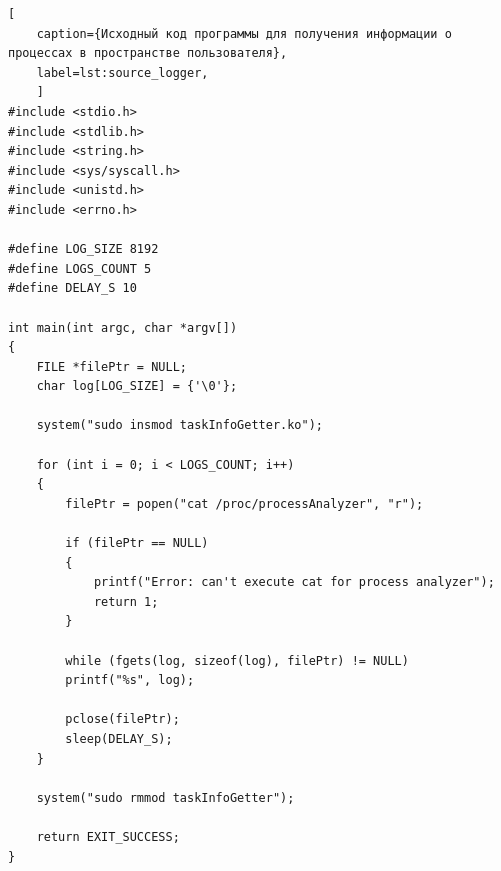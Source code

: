 \begin{lstlisting}[
	caption={Исходный код программы для получения информации о процессах в пространстве пользователя},
	label=lst:source_logger,
	]
#include <stdio.h>
#include <stdlib.h>
#include <string.h>
#include <sys/syscall.h>
#include <unistd.h>
#include <errno.h>

#define LOG_SIZE 8192
#define LOGS_COUNT 5
#define DELAY_S 10

int main(int argc, char *argv[])
{
	FILE *filePtr = NULL;
	char log[LOG_SIZE] = {'\0'};
	
	system("sudo insmod taskInfoGetter.ko");
	
	for (int i = 0; i < LOGS_COUNT; i++)
	{
		filePtr = popen("cat /proc/processAnalyzer", "r");
		
		if (filePtr == NULL)
		{
			printf("Error: can't execute cat for process analyzer");
			return 1;
		}
		
		while (fgets(log, sizeof(log), filePtr) != NULL)
		printf("%s", log);
		
		pclose(filePtr);
		sleep(DELAY_S);
	}
	
	system("sudo rmmod taskInfoGetter");
	
	return EXIT_SUCCESS;
}

\end{lstlisting}
